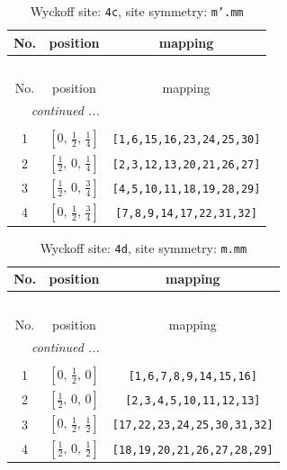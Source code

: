 \documentclass[fleqn,8pt]{jsarticle}
\begin{document}
\renewcommand{\arraystretch}{1.2}
\begin{longtable}{ccc}
\caption{Wyckoff site: {\tt 4c}, site symmetry: {\tt m'.mm}}
 \\
 \hline \hline
No. & position & mapping \\ \hline \endfirsthead

\multicolumn{2}{l}{\tablename\ \thetable{}} \\
 \hline \hline
No. & position & mapping \\ \hline \endhead

 \hline \hline
\multicolumn{2}{r}{\footnotesize\it continued ...} \\ \endfoot

 \hline \hline
\multicolumn{2}{r}{} \\ \endlastfoot

1 & $\left[ 0,\, \frac{1}{2},\, \frac{1}{4} \right]$ & {\tt [1,6,15,16,23,24,25,30]} \\ \hline
2 & $\left[ \frac{1}{2},\, 0,\, \frac{1}{4} \right]$ & {\tt [2,3,12,13,20,21,26,27]} \\ \hline
3 & $\left[ \frac{1}{2},\, 0,\, \frac{3}{4} \right]$ & {\tt [4,5,10,11,18,19,28,29]} \\ \hline
4 & $\left[ 0,\, \frac{1}{2},\, \frac{3}{4} \right]$ & {\tt [7,8,9,14,17,22,31,32]} \\
\end{longtable}
\renewcommand{\arraystretch}{1.2}
\begin{longtable}{ccc}
\caption{Wyckoff site: {\tt 4d}, site symmetry: {\tt m.mm}}
 \\
 \hline \hline
No. & position & mapping \\ \hline \endfirsthead

\multicolumn{2}{l}{\tablename\ \thetable{}} \\
 \hline \hline
No. & position & mapping \\ \hline \endhead

 \hline \hline
\multicolumn{2}{r}{\footnotesize\it continued ...} \\ \endfoot

 \hline \hline
\multicolumn{2}{r}{} \\ \endlastfoot

1 & $\left[ 0,\, \frac{1}{2},\, 0 \right]$ & {\tt [1,6,7,8,9,14,15,16]} \\ \hline
2 & $\left[ \frac{1}{2},\, 0,\, 0 \right]$ & {\tt [2,3,4,5,10,11,12,13]} \\ \hline
3 & $\left[ 0,\, \frac{1}{2},\, \frac{1}{2} \right]$ & {\tt [17,22,23,24,25,30,31,32]} \\ \hline
4 & $\left[ \frac{1}{2},\, 0,\, \frac{1}{2} \right]$ & {\tt [18,19,20,21,26,27,28,29]} \\
\end{longtable}
\end{document}
